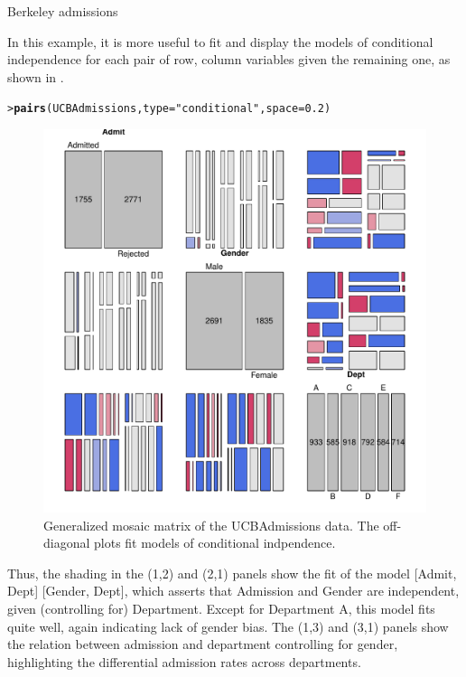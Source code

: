 \documentclass[10pt,krantz2]{krantz}\usepackage[]{graphicx}\usepackage[]{color}
\makeatletter
\newcommand{\hlnum}[1]{\textcolor[rgb]{0.686,0.059,0.569}{#1}}%
\newcommand{\hlstr}[1]{\textcolor[rgb]{0.192,0.494,0.8}{#1}}%
\newcommand{\hlstd}[1]{\textcolor[rgb]{0.345,0.345,0.345}{#1}}%
\newcommand{\hlkwc}[1]{\textcolor[rgb]{0.333,0.667,0.333}{#1}}%
\newcommand{\hlkwd}[1]{\textcolor[rgb]{0.737,0.353,0.396}{\textbf{#1}}}%
\newenvironment{kframe}{%
 \def\at@end@of@kframe{}%
 \ifinner\ifhmode%
  \def\at@end@of@kframe{\end{minipage}}%
  \begin{minipage}{\columnwidth}%
 \fi\fi%
 \def\FrameCommand##1{\hskip\@totalleftmargin \hskip-\fboxsep
 \colorbox{shadecolor}{##1}\hskip-\fboxsep
     \hskip-\linewidth \hskip-\@totalleftmargin \hskip\columnwidth}%
 \MakeFramed {\advance\hsize-\width
   \@totalleftmargin\z@ \linewidth\hsize
   \@setminipage}}%
 {\par\unskip\endMakeFramed%
 \at@end@of@kframe}
\newenvironment{knitrout}{}{} %
\renewenvironment{knitrout}{\small\renewcommand{\baselinestretch}{.85}}{} %
\makeatother
\begin{document}
\begin{Example}[berkeley4b]{Berkeley admissions}
\begin{knitrout}
\end{knitrout}

In this example, it is more useful to fit and display the models of conditional independence
for each pair of row, column variables given the remaining one, as shown in .
\begin{knitrout}
\color{fgcolor}\begin{kframe}
\begin{alltt}
\hlstd{> }\hlkwd{pairs}\hlstd{(UCBAdmissions,} \hlkwc{type} \hlstd{=} \hlstr{"conditional"}\hlstd{,} \hlkwc{space} \hlstd{=} \hlnum{0.2}\hlstd{)}
\end{alltt}
\end{kframe}\begin{figure}[!htb]

\centerline{\includegraphics[width=.8\textwidth]{ch05/fig/berk-pairs3-1} }

\caption[Generalized mosaic matrix of the UCBAdmissions data]{Generalized mosaic matrix of the UCBAdmissions data. The off-diagonal plots fit models of conditional indpendence.\label{fig:berk-pairs3}}
\end{figure}


\end{knitrout}
Thus, the shading in the (1,2) and (2,1) panels show the fit of the model
[Admit, Dept] [Gender, Dept],
which asserts that Admission and Gender are independent, given (controlling
for) Department.  Except for Department A, this model fits quite well,
again indicating lack of gender bias.
The (1,3) and (3,1) panels show the relation between admission and department
controlling for gender, highlighting the differential admission rates
across departments.

\end{Example}
\end{document}
